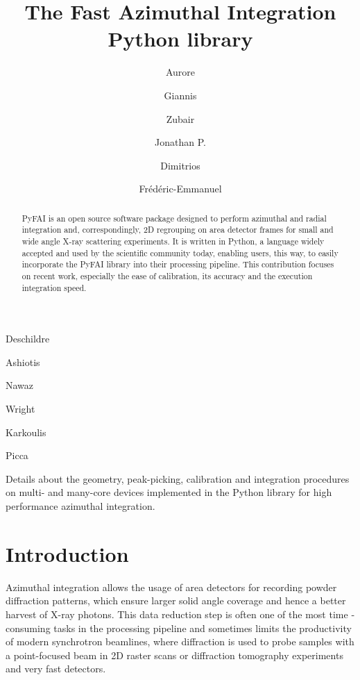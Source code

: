 \documentclass[preprint]{iucr}
\begin{document}
\title{The Fast Azimuthal Integration Python library}

    \author[a]{Aurore}{Deschildre}
    \author[a]{Giannis}{Ashiotis}
    \author[b]{Zubair}{Nawaz}
    \author[a]{Jonathan P.}{Wright}
    \author[a]{Dimitrios}{Karkoulis}
    \author[c]{Fr\'ed\'eric-Emmanuel}{Picca}


\maketitle

\begin{synopsis}
Details about the geometry, peak-picking, calibration and integration procedures
on multi- and many-core devices implemented in the Python library for high
performance azimuthal integration.
\end{synopsis}

\begin{abstract}
PyFAI is an open source software package designed to perform azimuthal and
radial integration and, correspondingly, 2D regrouping on area detector frames for small and wide
angle X-ray scattering experiments.
It is written in Python, a language widely accepted and used by the scientific
community today, enabling users, this way, to easily incorporate the PyFAI
library into their processing pipeline.
This contribution focuses on recent work, especially the ease of
calibration, its accuracy and the execution integration speed.
\end{abstract}

\section{Introduction}

Azimuthal integration allows the usage of area detectors for recording powder
diffraction patterns, which  ensure larger solid angle coverage and hence a
better harvest of X­-ray photons.
This data reduction step is often one of the most time ­consuming tasks in the
processing pipeline and sometimes limits the productivity of modern synchrotron
beamlines, where diffraction is used to probe samples with a point-focused
beam in 2D raster scans or diffraction tomography experiments and
very fast detectors.
\end{document}
